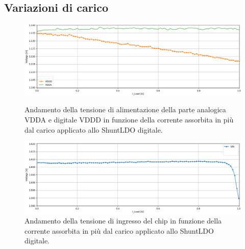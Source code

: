 \subsection{Variazioni di carico}
\label{VariazioniCarico}
\begin{figure}
\centering
\includegraphics[width=\textwidth]{Immagini/LoadVDDD}
\caption{Andamento della tensione di alimentazione della parte analogica VDDA e digitale VDDD in funzione della corrente assorbita in più dal carico applicato allo ShuntLDO digitale.}
\label{LoadVDDD}
\includegraphics[width=\textwidth]{Immagini/LoadVIND}
\caption{Andamento della tensione di ingresso del chip in funzione della corrente assorbita in più dal carico applicato allo ShuntLDO digitale.}
\label{LoadVIND}
\end{figure}


